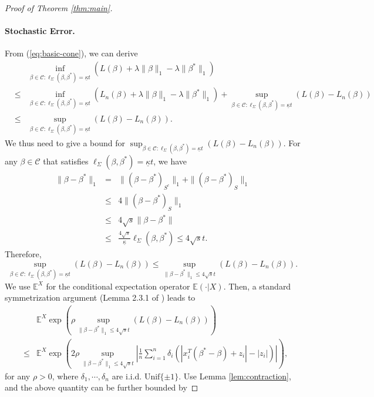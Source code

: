 \begin{proof}[Proof of Theorem \ref{thm:main}]
\paragraph{Stochastic Error.}
From (\ref{eq:basic-cone}), we can derive
\begin{eqnarray*}
&& \inf_{\beta\in\mathcal{C}:\ell_{\Sigma}(\beta,\beta^*)=\underline{\kappa}t}(L(\beta)+\lambda\|\beta\|_1-\lambda\|\beta^*\|_1) \\
&\leq& \inf_{\beta\in\mathcal{C}:\ell_{\Sigma}(\beta,\beta^*)=\underline{\kappa}t}(L_n(\beta)+\lambda\|\beta\|_1-\lambda\|\beta^*\|_1) + \sup_{\beta\in\mathcal{C}:\ell_{\Sigma}(\beta,\beta^*)=\underline{\kappa}t}(L(\beta)-L_n(\beta)) \\
&\leq& \sup_{\beta\in\mathcal{C}:\ell_{\Sigma}(\beta,\beta^*)=\underline{\kappa}t}(L(\beta)-L_n(\beta)).
\end{eqnarray*}
We thus need to give a bound for $\sup_{\beta\in\mathcal{C}:\ell_{\Sigma}(\beta,\beta^*)=\underline{\kappa}t}(L(\beta)-L_n(\beta))$. For any $\beta\in\mathcal{C}$ that satisfies $\ell_{\Sigma}(\beta,\beta^*)=\underline{\kappa}t$, we have
\begin{eqnarray}
\nonumber \|\beta-\beta^*\|_1 &=& \|(\beta-\beta^*)_{S^c}\|_1 + \|(\beta-\beta^*)_{S}\|_1 \\
\nonumber &\leq& 4\|(\beta-\beta^*)_{S}\|_1 \\
\nonumber &\leq& 4\sqrt{s}\|\beta-\beta^*\| \\
\label{eq:bound-for-l1} &\leq& \frac{4\sqrt{s}}{\underline{\kappa}}\ell_{\Sigma}(\beta,\beta^*) \leq 4\sqrt{s}t.
\end{eqnarray}
Therefore,
$$\sup_{\beta\in\mathcal{C}:\ell_{\Sigma}(\beta,\beta^*)=\underline{\kappa}t}(L(\beta)-L_n(\beta))\leq \sup_{\|\beta-\beta^*\|_1\leq 4\sqrt{s}t}(L(\beta)-L_n(\beta)).$$
We use $\mathbb{E}^X$ for the conditional expectation operator $\mathbb{E}(\cdot|X)$. Then, a standard symmetrization argument (Lemma 2.3.1 of \cite{wellner2013weak}) leads to
\begin{eqnarray*}
&& \mathbb{E}^X\exp\left(\rho \sup_{\|\beta-\beta^*\|_1\leq 4\sqrt{s}t}(L(\beta)-L_n(\beta))\right) \\
&\leq& \mathbb{E}^X\exp\left(2\rho \sup_{\|\beta-\beta^*\|_1\leq 4\sqrt{s}t}\left|\frac{1}{n}\sum_{i=1}^n\delta_i\left(|x_i^T(\beta^*-\beta)+z_i|-|z_i|\right)\right|\right),
\end{eqnarray*}
for any $\rho>0$, where $\delta_1,\cdots,\delta_n$ are i.i.d. $\text{Unif}\{\pm 1\}$. Use Lemma \ref{lem:contraction}, and the above quantity can be further bounded by

\end{proof}
